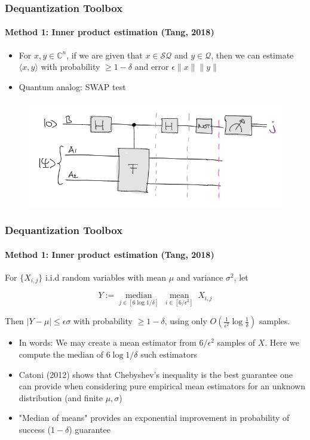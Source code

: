 \documentclass{beamer}
\newcommand\0{\mathbf{0}}
\newcommand\CC{\mathbb{C}}
\newcommand\<{\langle}
\renewcommand\>{\rangle}
\begin{document}
\begin{frame}
\frametitle{Dequantization Toolbox}
\framesubtitle{Method 1: Inner product estimation (Tang, 2018)}
\begin{itemize}
	\item For $x, y \in \CC^n$, if we are given that $x \in \mathcal{SQ}$ and $y \in \mathcal{Q}$, then we can estimate $\< x, y\>$ with probability $\geq 1 - \delta$ and error $\epsilon \|x\|\|y\|$ 
	\pause
	\item Quantum analog: SWAP test
\end{itemize}
\begin{figure}
\includegraphics[width= 0.5\linewidth]{swap_test.png}	
\end{figure}
\end{frame}

\begin{frame}
\frametitle{Dequantization Toolbox}
\framesubtitle{Method 1: Inner product estimation (Tang, 2018)}
\begin{fact} For $\{X_{i,j}\}$ i.i.d random variables with mean $\mu$ and variance $\sigma^2$, let 

$$Y := \underset{j \in [6\log 1/\delta]}{\operatorname{median}}\;\underset{i \in [6/\epsilon^2]}{\operatorname{mean}}\;X_{i,j}$$

Then $\vert Y - \mu\vert \leq \epsilon\sigma$ with probability $\geq 1-\delta$, using only $O(\frac{1}{\epsilon^2}\log\frac{1}{\delta})$ samples.
\end{fact}

\begin{itemize}
	\item In words: We may create a mean estimator from $6/\epsilon^2$ samples of $X$. Here we compute the median of $6\log 1/\delta$ such estimators
	\pause
	\item Catoni (2012) shows that Chebyshev's inequality is the best guarantee one can provide when considering pure empirical mean estimators for an unknown distribution (and finite $\mu, \sigma$)
	\item "Median of means" provides an exponential improvement in probability of success ($1 - \delta$) guarantee
\end{itemize}
\end{frame}
\end{document}
